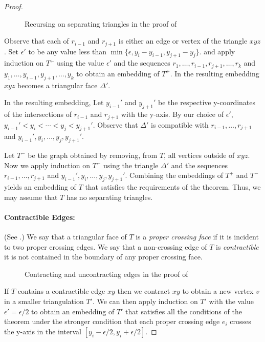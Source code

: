 \documentclass{patmorin}
\begin{document}
\begin{proof}
   \begin{figure}
      \caption{Recursing on separating triangles in the proof of
      }
   \end{figure}

   Observe that each of $r_{i-1}$ and $r_{j+1}$ is either an edge
   or vertex of the triangle $xyz$.  Set $\epsilon'$ to be any
   value less than $\min\{\epsilon,y_{i}-y_{i-1}, y_{j+1}-y_j\}$.
   and apply induction on $T^+$ using the value $\epsilon'$
   and the sequences $r_1,\ldots,r_{i-1},r_{j+1},\ldots,r_k$ and
   $y_1,\ldots,y_{i-1},y_{j+1},\ldots,y_k$ to obtain an embedding
   of $T^+$.  In the resulting embedding $xyz$ becomes a triangular face
   $\Delta'$.

   In the resulting embedding, Let $y_{i-1}'$ and $y_{j+1}'$
   be the respective y-coordinates of the intersections of
   $r_{i-1}$ and $r_{j+1}$ with the y-axis.  By our choice of
   $\epsilon'$, $y_{i-1}'<y_i<\cdots<y_j<y_{j+1}'$.  Observe that
   $\Delta'$ is compatible with $r_{i-1},\ldots,r_{j+1}$ and
   $y_{i-1}',y_i,\ldots,y_j,y_{j+1}'$.

   Let $T^-$ be the graph obtained by removing, from $T$, all
   vertices outside of $xyz$.  Now we apply induction on $T^-$ using
   the triangle $\Delta'$ and the sequences $r_{i-1},\ldots,r_{j+1}$ and
   $y_{i-1}',y_i,\ldots,y_{j},y_{j+1}'$.  Combining the embeddings of $T^+$
   and $T^-$ yields an embedding of $T$ that satisfies the requirements of
   the theorem.  Thus, we may assume that $T$ has no separating triangles.

   \paragraph{Contractible Edges:}
   (See .)
   We say that a triangular face of $T$ is a \emph{proper crossing
   face} if it is incident to two proper crossing edges.  We say that a
   non-crossing edge of $T$ is \emph{contractible} it is not contained
   in the boundary of any proper crossing face.  
   \begin{figure}
      \caption{Contracting and uncontracting edges in the proof of
      }
   \end{figure}

   If $T$ contains a contractible edge $xy$ then we contract $xy$ to
   obtain a new vertex $v$ in a smaller triangulation $T'$.   We can then apply
   induction on $T'$ with the value $\epsilon'=\epsilon/2$ to obtain an
   embedding of $T'$ that satisfies all the conditions of the theorem under
   the stronger condition that each proper crossing edge $e_i$ crosses
   the y-axis in the interval $[y_i-\epsilon/2,y_i+\epsilon/2]$.


\end{proof}
\end{document}
